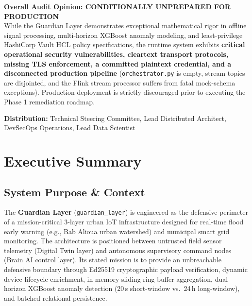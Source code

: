 \documentclass[10pt,a4paper]{report}
\begin{document}
\begin{titlepage}
\begin{center}
\begin{tcolorbox}[colback=red!5!white,colframe=red!75!black,title=\textbf{Executive Audit Verdict},arc=2mm]
\textbf{Overall Audit Opinion: CONDITIONALLY UNPREPARED FOR PRODUCTION}\\
While the Guardian Layer demonstrates exceptional mathematical rigor in offline signal processing, multi-horizon XGBoost anomaly modeling, and least-privilege HashiCorp Vault HCL policy specifications, the runtime system exhibits \textbf{critical operational security vulnerabilities, cleartext transport protocols, missing TLS enforcement, a committed plaintext credential, and a disconnected production pipeline} (\texttt{orchestrator.py} is empty, stream topics are disjointed, and the Flink stream processor suffers from fatal mock-schema exceptions). Production deployment is strictly discouraged prior to executing the Phase 1 remediation roadmap.
\end{tcolorbox}

\vspace{1cm}
{\small \textbf{Distribution:} Technical Steering Committee, Lead Distributed Architect, DevSecOps Operations, Lead Data Scientist}
\end{center}
\end{titlepage}

\tableofcontents
\newpage

\chapter{Executive Summary}

\section{System Purpose \& Context}
The \textbf{Guardian Layer} (\texttt{guardian\_layer}) is engineered as the defensive perimeter of a mission-critical 3-layer urban IoT infrastructure designed for real-time flood early warning (e.g., Bab Alioua urban watershed) and municipal smart grid monitoring. The architecture is positioned between untrusted field sensor telemetry (Digital Twin layer) and autonomous supervisory command nodes (Brain AI control layer). Its stated mission is to provide an unbreachable defensive boundary through Ed25519 cryptographic payload verification, dynamic device lifecycle enrichment, in-memory sliding ring-buffer aggregation, dual-horizon XGBoost anomaly detection (20\,s short-window vs.\ 24\,h long-window), and batched relational persistence.
\end{document}
